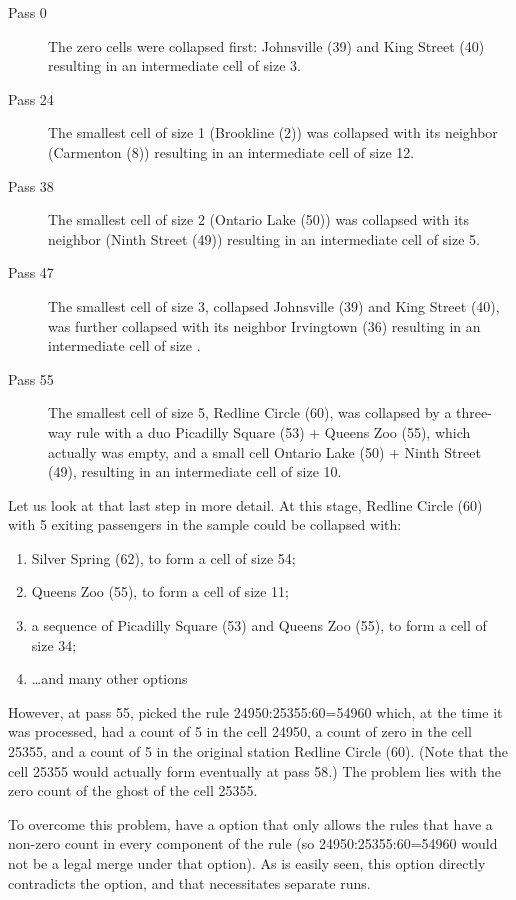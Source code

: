 \begin{description}
    \item[Pass 0] The zero cells were collapsed first: Johnsville (39) and King Street (40) resulting
        in an intermediate cell of size 3.
    \item[Pass 24] The smallest cell of size 1 (Brookline (2)) was collapsed with its neighbor
        (Carmenton (8)) resulting in an intermediate cell of size 12.
    \item[Pass 38] The smallest cell of size 2 (Ontario Lake (50)) was collapsed with its neighbor
        (Ninth Street (49)) resulting in an intermediate cell of size 5.
    \item[Pass 47] The smallest cell of size 3, collapsed Johnsville (39) and King Street (40),
        was further collapsed with its neighbor Irvingtown (36) resulting in an intermediate cell of size .
    \item[Pass 55] The smallest cell of size 5, Redline Circle (60), was collapsed by a three-way rule 
        with a duo Picadilly Square (53) + Queens Zoo (55), which actually was empty, and a small cell 
        Ontario Lake (50) + Ninth Street (49), resulting in an intermediate cell of size 10.
\end{description}

Let us look at that last step in more detail. At this stage, Redline Circle (60) with 5 exiting passengers in
the sample could be collapsed with:
\begin{enumerate}
    \item Silver Spring (62), to form a cell of size 54;
    \item Queens Zoo (55), to form a cell of size 11;
    \item a sequence of Picadilly Square (53) and Queens Zoo (55), to form a cell of size 34;
    \item \ldots and many other options
\end{enumerate}
However, at pass 55,  picked the rule 24950:25355:60=54960 which, at the time it was
processed, had a count of 5 in the cell 24950, a count of zero in the cell 25355, and a count of 5 in the
original station Redline Circle (60). (Note that the cell 25355 would actually form eventually at pass 58.)
The problem lies with the zero count of the ghost of the cell 25355.

To overcome this problem,  have a  option that only allows the rules
that have a non-zero count in every component of the rule (so 24950:25355:60=54960 would not be a legal
merge under that option). As is easily seen, this option directly contradicts the  option,
and that necessitates separate runs.

